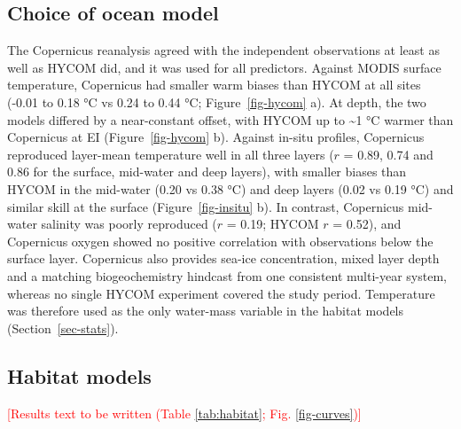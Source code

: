 \documentclass[
  11pt,
]{article}
\newcommand{\ins}[1]{\textcolor{red}{[#1]}}
\begin{document}
\subsection{Choice of ocean model}\label{choice-of-ocean-model}

The Copernicus reanalysis agreed with the independent observations at
least as well as HYCOM did, and it was used for all predictors. Against
MODIS surface temperature, Copernicus had smaller warm biases than HYCOM
at all sites (-0.01 to 0.18 °C vs 0.24 to 0.44 °C;
Figure~\ref{fig-hycom} a). At depth, the two models differed by a
near-constant offset, with HYCOM up to \textasciitilde1 °C warmer than
Copernicus at EI (Figure~\ref{fig-hycom} b). Against in-situ profiles,
Copernicus reproduced layer-mean temperature well in all three layers
(\(r\) = 0.89, 0.74 and 0.86 for the surface, mid-water and deep
layers), with smaller biases than HYCOM in the mid-water (0.20 vs 0.38
°C) and deep layers (0.02 vs 0.19 °C) and similar skill at the surface
(Figure~\ref{fig-insitu} b). In contrast, Copernicus mid-water salinity
was poorly reproduced (\(r\) = 0.19; HYCOM \(r\) = 0.52), and Copernicus
oxygen showed no positive correlation with observations below the
surface layer. Copernicus also provides sea-ice concentration, mixed
layer depth and a matching biogeochemistry hindcast from one consistent
multi-year system, whereas no single HYCOM experiment covered the study
period. Temperature was therefore used as the only water-mass variable
in the habitat models (Section~\ref{sec-stats}).

\subsection{Habitat models}\label{habitat-models}

\ins{Results text to be written (Table \ref{tab:habitat}; Fig. \ref{fig-curves})}
\end{document}
